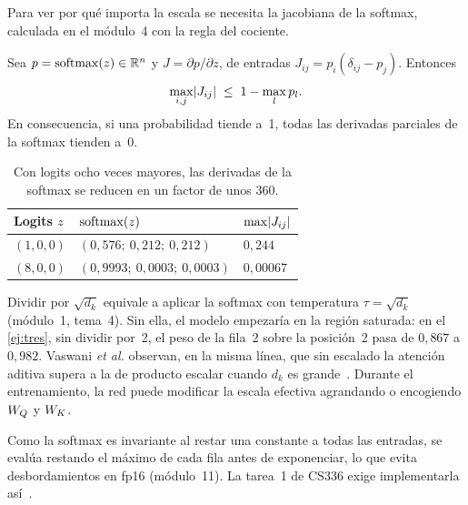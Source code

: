 Para ver por qué importa la escala se necesita la jacobiana de la softmax, calculada en el módulo~4 con la regla del cociente.

\begin{proposicion}\label{prop:saturacion}
Sea $p=\operatorname{softmax}(z)\in\mathbb{R}^{n}$ y $J=\partial p/\partial z$, de entradas $J_{ij}=p_i(\delta_{ij}-p_j)$. Entonces
\[
\max_{i,j}\lvert J_{ij}\rvert\;\le\;1-\max_{l}p_l .
\]
En consecuencia, si una probabilidad tiende a~1, todas las derivadas parciales de la softmax tienden a~0.
\end{proposicion}

\begin{table}[h]
\centering
\begin{tabular}{@{}lll@{}}
\toprule
Logits $z$ & $\operatorname{softmax}(z)$ & $\max\lvert J_{ij}\rvert$ \\
\midrule
$(1,0,0)$ & $(0{,}576;\allowbreak\ 0{,}212;\allowbreak\ 0{,}212)$ & $0{,}244$ \\
$(8,0,0)$ & $(0{,}9993;\allowbreak\ 0{,}0003;\allowbreak\ 0{,}0003)$ & $0{,}00067$ \\
\bottomrule
\end{tabular}
\caption{Con logits ocho veces mayores, las derivadas de la softmax se reducen en un factor de unos 360.}
\label{tab:saturacion}
\end{table}

\begin{observacion}
Dividir por $\sqrt{d_k}$ equivale a aplicar la softmax con temperatura $\tau=\sqrt{d_k}$ (módulo~1, tema~4). Sin ella, el modelo empezaría en la región saturada: en el \cref{ej:tres}, sin dividir por~2, el peso de la fila~2 sobre la posición~2 pasa de $0{,}867$ a $0{,}982$. Vaswani \emph{et al.} observan, en la misma línea, que sin escalado la atención aditiva supera a la de producto escalar cuando $d_k$ es grande~\cite[§3.2.1]{vaswani}. Durante el entrenamiento, la red puede modificar la escala efectiva agrandando o encogiendo $W_{Q}$ y $W_{K}$.
\end{observacion}

\begin{observacion}
Como la softmax es invariante al restar una constante a todas las entradas, se evalúa restando el máximo de cada fila antes de exponenciar, lo que evita desbordamientos en fp16 (módulo~11). La tarea~1 de CS336 exige implementarla así~\cite[§3.4.4]{cs336}.
\end{observacion}

